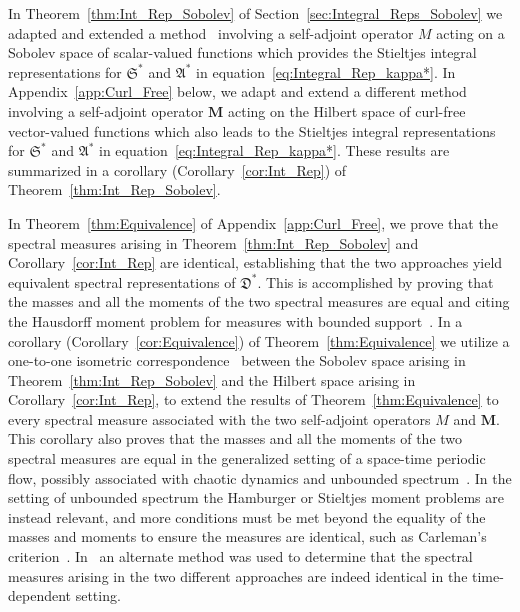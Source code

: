 \documentclass[english,12pt,jmp,graphicx]{revtex4-1}
\newcommand{\thmref}[1]{Theorem~\ref{#1}}
\newcommand{\corref}[1]{Corollary~\ref{#1}}
\newcommand{\secref}[1]{Section~\ref{#1}}
\newcommand{\appref}[1]{Appendix~\ref{#1}}
\newcommand{\Sg}{\mathfrak{S}}
\newcommand{\Ag}{\mathfrak{A}}
\newcommand{\Dg}{\mathfrak{D}}
\newcommand{\Mb}{\mathbf{M}}
\begin{document}
In \thmref{thm:Int_Rep_Sobolev} of \secref{sec:Integral_Reps_Sobolev}
we adapted and extended a
method~\cite{Bhattacharya:AAP:1999:951,Bhattacharya:1989:ASD,Pavliotis:PHD_Thesis} involving
a self-adjoint operator $M$ acting on a Sobolev space of scalar-valued
functions which provides the Stieltjes integral representations for
$\Sg^*$ and $\Ag^*$ in equation~\eqref{eq:Integral_Rep_kappa*}. In
\appref{app:Curl_Free} below, we adapt and extend a different
method~\cite{Avellaneda:PRL-753,Avellaneda:CMP-339} involving a
self-adjoint operator $\Mb$ acting on the Hilbert space of curl-free
vector-valued functions which also leads to the Stieltjes integral
representations for $\Sg^*$ and $\Ag^*$ in
equation~\eqref{eq:Integral_Rep_kappa*}. These results are summarized
in a corollary (\corref{cor:Int_Rep}) of
\thmref{thm:Int_Rep_Sobolev}. 





In \thmref{thm:Equivalence} of \appref{app:Curl_Free}, we prove that
the spectral measures arising in  \thmref{thm:Int_Rep_Sobolev} and
\corref{cor:Int_Rep} are identical, establishing that the two
approaches yield equivalent spectral representations of $\Dg^*$. This
is accomplished by proving that the masses and all the moments of the
two spectral measures are equal and citing the Hausdorff moment
problem for measures with bounded
support~\cite{Stone:64,Akhiezer:Book:1965}. In a corollary
(\corref{cor:Equivalence}) of \thmref{thm:Equivalence} we utilize a
one-to-one isometric 
correspondence~\cite{Murphy:ADSTPF-2017} between the Sobolev space
arising in \thmref{thm:Int_Rep_Sobolev} and the Hilbert  
space arising in \corref{cor:Int_Rep}, to extend the results of
\thmref{thm:Equivalence} to every spectral measure associated with the
two self-adjoint operators $M$ and $\Mb$. This corollary also proves
that the masses 
and all the moments of the two spectral measures are equal in the
generalized setting of a space-time periodic flow, possibly associated
with chaotic dynamics and unbounded spectrum~\cite{Murphy:ADSTPF-2017}. 
In the setting of unbounded spectrum the Hamburger or Stieltjes moment
problems are instead relevant, and more conditions must be met beyond
the equality of the masses and moments to ensure the measures are
identical, such as Carleman's
criterion~\cite{Akhiezer:Book:1965}. In~\cite{Murphy:ADSTPF-2017} an
alternate method was used to determine that the spectral measures
arising in the two different approaches are indeed identical in the
time-dependent setting.    
\end{document}
